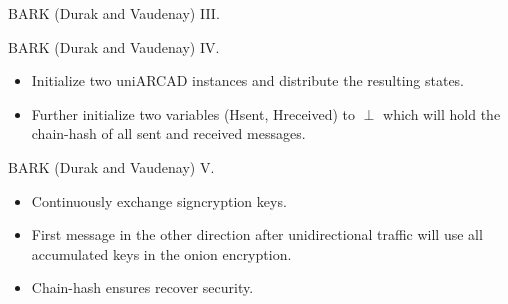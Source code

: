 \documentclass{beamer}
\begin{document}
\begin{frame}{BARK (Durak and Vaudenay) III.}
   \begin{figure}[h]
     \centering
     \setlength{\fboxsep}{10pt}
     \scalebox{0.7}{%
       \fbox{%
          
       }
     }
  \end{figure}
\end{frame}

\begin{frame}{BARK (Durak and Vaudenay) IV.}
   \scriptsize
  \begin{minipage}[h]{0.49\textwidth}
      \begin{figure}[ht]
        \centering
        \setlength{\fboxsep}{10pt}
        \scalebox{0.7}{%
        \fbox{%
          
        }
      }
    \end{figure}
    \end{minipage}
  \begin{minipage}[h]{0.49\textwidth}
      \begin{itemize}
      \item Initialize two uniARCAD instances and distribute the
        resulting states.
      \item Further initialize two variables (Hsent, Hreceived) to $\perp$ which will
        hold the chain-hash of all sent and received messages.
      \end{itemize}
    \end{minipage}
  \end{frame}

\begin{frame}{BARK (Durak and Vaudenay) V.}
  \scriptsize
  \begin{figure}[ht]
     \centering
     \setlength{\fboxsep}{10pt}
     \scalebox{0.5}{%
       \fbox{%
         
       }
     }
  \end{figure}
  \begin{itemize}
  \item Continuously exchange signcryption keys.
  \item First message in the other direction after unidirectional traffic
    will use all accumulated keys in the onion encryption.
  \item Chain-hash ensures recover security.
  \end{itemize}
\end{frame}
\end{document}
